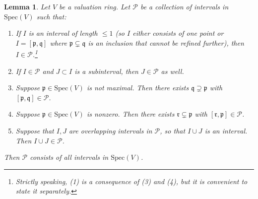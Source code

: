 \documentclass[reqno]{amsart}
\newcommand{\spec}{\mathrm{Spec}}
\newtheorem{lemma}[theorem]{Lemma}
\theoremstyle{definition}
\begin{document}
\begin{lemma} 
\label{intervallemma}
Let $V$ be a valuation ring. 
Let $\mathcal{P}$ be a collection of intervals in $\spec(V)$ such that: 
\begin{enumerate}
\item If $I$ is an interval of \emph{length $\leq 1$} (so $I$ either consists
of one point or $I = [\mathfrak{p}, \mathfrak{q}]$ where $\mathfrak{p}
\subsetneq \mathfrak{q}$ is an inclusion that cannot be refined further), then
$I \in \mathcal{P}$.\footnote{Strictly speaking, (1) is a consequence of (3) and (4),
but it is convenient to state it separately.} 
\item
If $I \in \mathcal{P}$ and $J \subset I$ is a subinterval, then $ J \in
\mathcal{P}$ as well. 
\item Suppose $\mathfrak{p} \in \spec(V)$ is not maximal. Then there exists 
$\mathfrak{q} \supsetneq \mathfrak{p}$ with $[\mathfrak{p}, \mathfrak{q}] \in
\mathcal{P}$. 
\item Suppose $\mathfrak{p} \in \spec(V)$ is nonzero. Then there exists 
$\mathfrak{r} \subsetneq \mathfrak{p}$ with $[\mathfrak{r}, \mathfrak{p}] \in
\mathcal{P}$. 

\item 
Suppose that $I, J$ are overlapping intervals in $\mathcal{P}$, so that $I \cup J$ is an
interval. Then $I \cup J \in \mathcal{P}$.  
\end{enumerate}
Then $\mathcal{P}$ consists of all intervals in $\spec(V)$. 
\end{lemma} 
\end{document}
